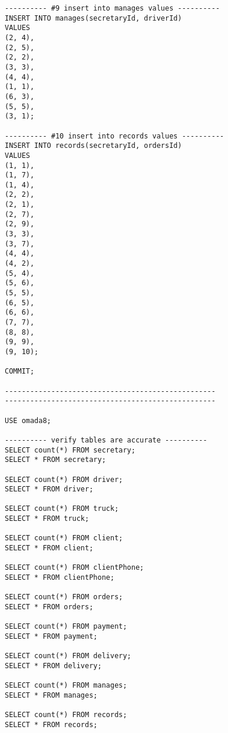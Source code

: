 \begin{lstlisting}
---------- #9 insert into manages values ----------
INSERT INTO manages(secretaryId, driverId)
VALUES
(2, 4),
(2, 5),
(2, 2),
(3, 3),
(4, 4),
(1, 1),
(6, 3),
(5, 5),
(3, 1);

---------- #10 insert into records values ----------
INSERT INTO records(secretaryId, ordersId)
VALUES
(1, 1),
(1, 7),
(1, 4),
(2, 2),
(2, 1),
(2, 7),
(2, 9),
(3, 3),
(3, 7),
(4, 4),
(4, 2),
(5, 4),
(5, 6),
(5, 5),
(6, 5),
(6, 6),
(7, 7),
(8, 8),
(9, 9),
(9, 10);

COMMIT;

--------------------------------------------------
--------------------------------------------------

USE omada8;

---------- verify tables are accurate ----------
SELECT count(*) FROM secretary; 
SELECT * FROM secretary;

SELECT count(*) FROM driver;
SELECT * FROM driver;

SELECT count(*) FROM truck;
SELECT * FROM truck;

SELECT count(*) FROM client;
SELECT * FROM client;

SELECT count(*) FROM clientPhone;
SELECT * FROM clientPhone;

SELECT count(*) FROM orders;
SELECT * FROM orders;

SELECT count(*) FROM payment;
SELECT * FROM payment;

SELECT count(*) FROM delivery;
SELECT * FROM delivery;

SELECT count(*) FROM manages;
SELECT * FROM manages;

SELECT count(*) FROM records;
SELECT * FROM records;
\end{lstlisting}